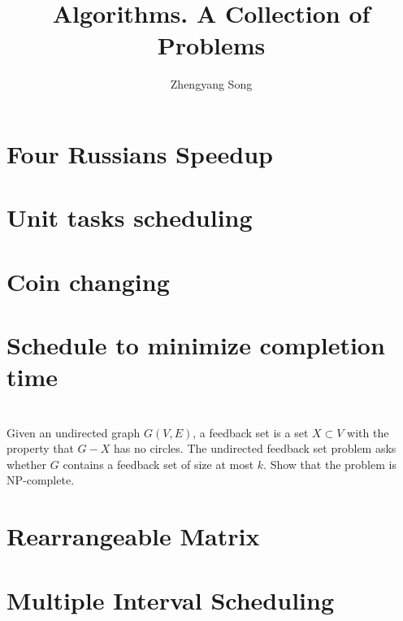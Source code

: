 \documentclass[a4paper]{article}
\title{Algorithms. A Collection of Problems}
\author{Zhengyang Song}
\begin{document}
\maketitle








\section{Four Russians Speedup}






\section{Unit tasks scheduling}
\section{Coin changing}
\section{Schedule to minimize completion time}
\section{}
\section{}
\section{}
Given an undirected graph $G(V,E)$, a feedback set is a set $X\subset V$ with the property that $G-X$ has no circles. The undirected feedback set problem asks whether $G$ contains a feedback set of size at most $k$. Show that the problem is NP-complete.
\section{Rearrangeable Matrix}

\section{Multiple Interval Scheduling}
\section{}


\end{document}
